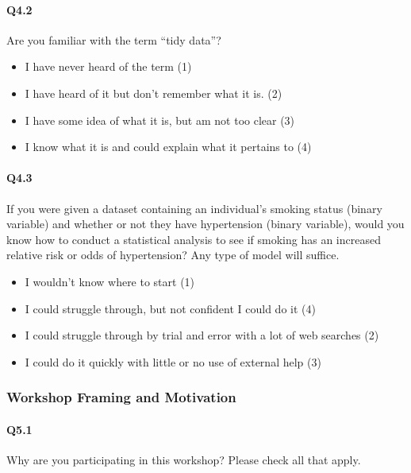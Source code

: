\documentclass[030-workshop.tex]{subfiles}
\begin{document}
    \paragraph{Q4.2}

    Are you familiar with the term ``tidy data''?

    \begin{itemize}
        \item I have never heard of the term  (1)
        \item I have heard of it but don’t remember what it is.  (2)
        \item I have some idea of what it is, but am not too clear  (3)
        \item I know what it is and could explain what it pertains to  (4)
    \end{itemize}

    \paragraph{Q4.3}

    If you were given a dataset containing an individual's smoking status
    (binary variable) and whether or not they have hypertension (binary variable),
    would you know how to conduct a statistical analysis to see
    if smoking has an increased relative risk or odds of hypertension? Any
    type of model will suffice.

    \begin{itemize}
        \item I wouldn't know where to start  (1)
        \item I could struggle through, but not confident I could do it  (4)
        \item I could struggle through by trial and error with a lot of web searches  (2)
        \item I could do it quickly with little or no use of external help  (3)
    \end{itemize}

\subsubsection{Workshop Framing and Motivation}

    \paragraph{Q5.1}

        Why are you participating in this workshop? Please check all that apply.
\end{document}
